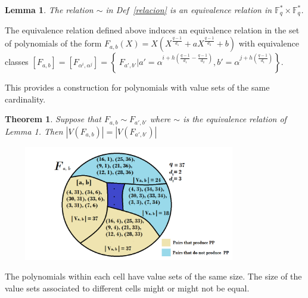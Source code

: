 \documentclass[landscape,final,paperwidth=48in,paperheight=36in]{baposter}
\newtheorem*{example*}{Example}
\newtheorem{lemma}{Lemma}
\newtheorem{theorem}{Theorem}
\begin{document}
\begin{poster}
{\begin{lemma}
  
  The relation $\sim$ in Def~\ref{relacion} is an equivalence relation in $\mathbb{F}_q^* \times \mathbb{F}_q^*$.

\end{lemma}


  The equivalence relation defined above induces an equivalence relation in the set of polynomials of the form $F_{a,b}(X) = X(X^{\frac{q-1}{d_1}} + aX^{\frac{q-1}{d_2}} +b)$ with equivalence classes $[F_{a,b}] = [F_{\alpha^i, \alpha^j}] = \left\{\ F_{a',b'} | a' = \alpha^{i+h(\frac{q-1}{d_1} - \frac{q-1}{d_2})}, b' = \alpha^{j+h(\frac{q-1}{d_1})} \right\}$.

  This provides a construction for polynomials with value sets of the same cardinality. 
\begin{theorem}
  
  Suppose that $F_{a,b} \sim F_{a',b'}$ where $\sim$ is the equivalence relation of Lemma 1. Then $|V(F_{a,b})| = |V(F_{a',b'})|$

\end{theorem}

\includegraphics[width=11cm, height=5cm]{clases}

{\small * The polynomials within each cell have value sets of the same size. The size of the value sets associated to different cells might or might not be equal.}

}\label{Results}

\end{poster}
\end{document}
